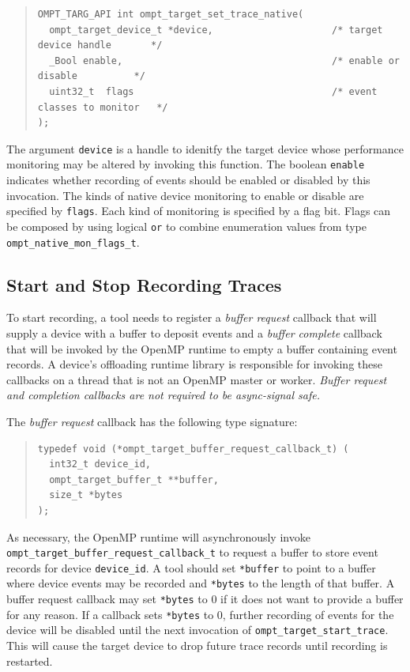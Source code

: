 \documentclass{article}
\begin{document}
\begin{quote}
\begin{verbatim}
OMPT_TARG_API int ompt_target_set_trace_native(
  ompt_target_device_t *device,                     /* target device handle       */
  _Bool enable,                                     /* enable or disable          */
  uint32_t  flags                                   /* event classes to monitor   */
);
\end{verbatim}
\end{quote}
The argument \verb|device| is a handle to idenitfy the target device whose performance monitoring may be altered by invoking this function. 
The boolean \verb|enable| indicates whether recording of events should be enabled or disabled by this invocation.
The kinds of native device monitoring to enable or disable are specified by \verb|flags|. Each kind of monitoring is specified by a flag bit. Flags can be composed by using logical {\tt or}  to combine enumeration values from type \verb|ompt_native_mon_flags_t|.

\subsection{Start and Stop Recording Traces}
\label{sec:start-stop-recording}

To start recording, a tool needs to register a \emph{buffer request} callback that will supply a device with a buffer to deposit events and a \emph{buffer complete} callback that will be invoked by the OpenMP runtime to empty a buffer containing event records. A device's offloading runtime library is responsible for invoking these callbacks on a thread that is not an OpenMP master or worker. {\em Buffer request and completion callbacks are not required to  be async-signal safe.}

The \emph{buffer request} callback has the following type signature:
\begin{quote}
\begin{verbatim}
typedef void (*ompt_target_buffer_request_callback_t) (
  int32_t device_id,
  ompt_target_buffer_t **buffer,
  size_t *bytes
);
\end{verbatim}
\end{quote}
As necessary, the OpenMP runtime will asynchronously invoke \verb|ompt_target_buffer_request_callback_t| to request a buffer to store event records for device \verb|device_id|.
A tool should set \verb|*buffer| to point to a buffer where device events may be recorded and \verb|*bytes| to the length of that buffer.
A buffer request callback  may set \verb|*bytes| to 0 if it does not want to provide a buffer for any reason. If a callback sets \verb|*bytes| to 0, further recording of events for the device will be disabled until the next invocation of \verb|ompt_target_start_trace|. This will cause the target device to drop future trace records until recording is restarted.
\end{document}
